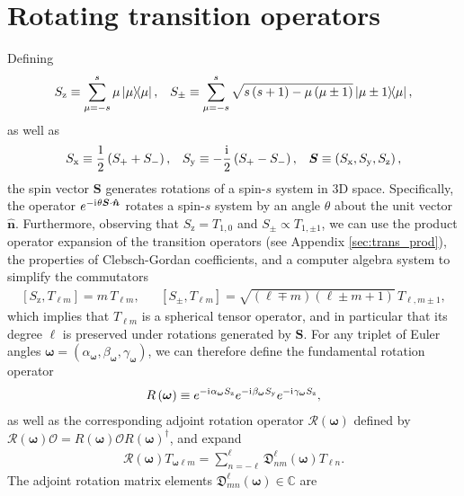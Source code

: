 \documentclass[nofootinbib,notitlepage,twocolumn]{revtex4-2}
\newcommand{\f}[2]{\dfrac{#1}{#2}} %
\newcommand{\p}[1]{\left(#1\right)} %
\renewcommand{\sp}[1]{\left[#1\right]} %
\renewcommand{\v}{\bm} %
\newcommand{\uv}[1]{\bm{\hat{#1}}} %
\renewcommand{\i}{\mathrm{i}\mkern1mu} %
\newcommand{\1}{\mathds{1}}
\newcommand{\x}{\text{x}}
\newcommand{\y}{\text{y}}
\newcommand{\z}{\text{z}}
\renewcommand{\O}{\mathcal{O}}
\newcommand{\R}{\mathcal{R}}
\newcommand{\D}{\mathfrak{D}}
\newcommand{\CC}{\mathbb{C}}
\begin{document}



\onecolumngrid
\appendix

\section{Rotating transition operators}
\label{sec:rotations}

Defining
\begin{align}
  S_\z \equiv \sum_{\mu=-s}^s \mu \op{\mu},
  &&
  S_\pm \equiv \sum_{\mu=-s}^s
  \sqrt{s\p{s+1}-\mu\p{\mu\pm1}} \op{\mu\pm1}{\mu},
\end{align}
as well as
\begin{align}
  S_\x \equiv \f12\p{S_+ + S_-},
  &&
  S_\y \equiv -\f\i2\p{S_+-S_-},
  &&
  \v S \equiv \p{S_\x,S_\y,S_\z},
\end{align}
the spin vector $\v S$ generates rotations of a spin-$s$ system in 3D space.
Specifically, the operator $e^{-\i\theta\v S\cdot\uv n}$ rotates a spin-$s$ system by an angle $\theta$ about the unit vector $\uv n$.
Furthermore, observing that $S_\z=T_{1,0}$ and $S_\pm\propto T_{1,\pm1}$, we can use the product operator expansion of the transition operators (see Appendix \ref{sec:trans_prod}), the properties of Clebsch-Gordan coefficients, and a computer algebra system to simplify the commutators
\begin{align}
  \sp{S_\z,T_{\ell m}} = m\, T_{\ell m},
  &&
  \sp{S_\pm,T_{\ell m}} = \sqrt{\p{\ell\mp m}\p{\ell\pm m+1}}\, T_{\ell,m\pm1},
\end{align}
which implies that $T_{\ell m}$ is a spherical tensor operator, and in particular that its degree $\ell$ is preserved under rotations generated by $\v S$.
For any triplet of Euler angles $\v\omega=\p{\alpha_{\v\omega},\beta_{\v\omega},\gamma_{\v\omega}}$, we can therefore define the fundamental rotation operator
\begin{align}
  R\p{\v\omega} \equiv e^{-\i\alpha_{\v\omega}S_\z} e^{-\i\beta_{\v\omega}S_\y} e^{-\i\gamma_{\v\omega}S_\z},
\end{align}
as well as the corresponding adjoint rotation operator $\R\p{\v\omega}$ defined by $\R\p{\v\omega}\O = R\p{\v\omega} \O R\p{\v\omega}^\dag$, and expand
\begin{align}
  \R\p{\v\omega} T_{\v\omega\ell m}
  = \sum_{n=-\ell}^\ell \D_{nm}^\ell\p{\v\omega} T_{\ell n}.
\end{align}
The adjoint rotation matrix elements $\D_{mn}^\ell\p{\v\omega}\in\CC$ are
\end{document}
